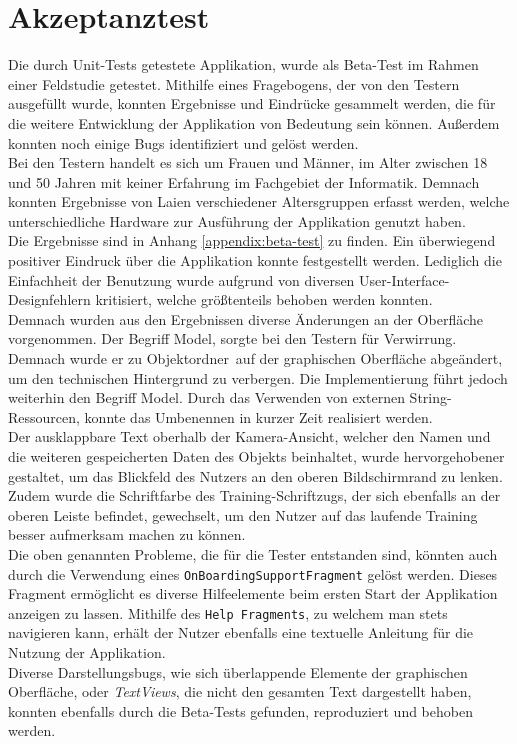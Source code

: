 \documentclass[oneside]{ausarbeitung}
\begin{document}
\section{Akzeptanztest}
Die durch Unit-Tests getestete Applikation, wurde als Beta-Test im Rahmen einer Feldstudie getestet. Mithilfe eines Fragebogens, der von den Testern ausgefüllt wurde, konnten Ergebnisse und Eindrücke gesammelt werden, die für die weitere Entwicklung der Applikation von Bedeutung sein können. Außerdem konnten noch einige Bugs identifiziert und gelöst werden.\\
Bei den Testern handelt es sich um Frauen und Männer, im Alter zwischen 18 und 50 Jahren mit keiner Erfahrung im Fachgebiet der Informatik. Demnach konnten Ergebnisse von Laien verschiedener Altersgruppen erfasst werden, welche unterschiedliche Hardware zur Ausführung der Applikation genutzt haben.\\
Die Ergebnisse sind in Anhang \ref{appendix:beta-test} zu finden. Ein überwiegend positiver Eindruck über die Applikation konnte festgestellt werden. Lediglich die Einfachheit der Benutzung wurde aufgrund von diversen User-Interface-Designfehlern kritisiert, welche größtenteils behoben werden konnten.\\
Demnach wurden aus den Ergebnissen diverse Änderungen an der Oberfläche vorgenommen. Der Begriff \glqq Model\grqq, sorgte bei den Testern für Verwirrung. Demnach wurde er zu \glqq Objektordner\grqq\ auf der graphischen Oberfläche abgeändert, um den technischen Hintergrund zu verbergen. Die Implementierung führt jedoch weiterhin den Begriff Model. Durch das Verwenden von externen String-Ressourcen, konnte das Umbenennen in kurzer Zeit realisiert werden. \\
Der ausklappbare Text oberhalb der Kamera-Ansicht, welcher den Namen und die weiteren gespeicherten Daten des Objekts beinhaltet, wurde hervorgehobener gestaltet, um das Blickfeld des Nutzers an den oberen Bildschirmrand zu lenken. Zudem wurde die Schriftfarbe des \glqq Training\grqq-Schriftzugs, der sich ebenfalls an der oberen Leiste befindet, gewechselt, um den Nutzer auf das laufende Training besser aufmerksam machen zu können.\\
Die oben genannten Probleme, die für die Tester entstanden sind, könnten auch durch die Verwendung eines \texttt{OnBoardingSupportFragment} gelöst werden. Dieses Fragment ermöglicht es diverse Hilfeelemente beim ersten Start der Applikation anzeigen zu lassen. Mithilfe des \texttt{Help Fragments}, zu welchem man stets navigieren kann, erhält der Nutzer ebenfalls eine textuelle Anleitung für die Nutzung der Applikation.\\
Diverse Darstellungsbugs, wie sich überlappende Elemente der graphischen Oberfläche, oder \textit{TextViews}, die nicht den gesamten Text dargestellt haben, konnten ebenfalls durch die Beta-Tests gefunden, reproduziert und behoben werden.
\end{document}
